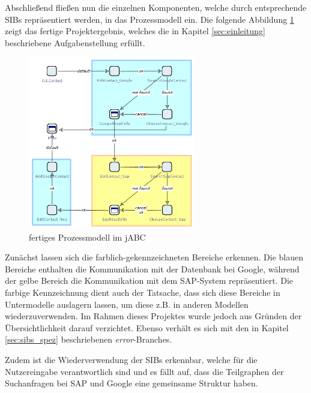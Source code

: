 Abschließend fließen nun die einzelnen Komponenten, welche durch entsprechende SIBs repräsentiert werden, in das Prozessmodell ein. Die folgende Abbildung \ref{fig:jabcmodel} zeigt das fertige Projektergebnis, welches die in Kapitel \ref{sec:einleitung} beschriebene Aufgabenstellung erfüllt.

\begin{figure}[h!t]
\begin{center}
\includegraphics[width=0.65\textwidth]{Bilder/jabc_Model.png}
\end{center}
\caption{fertiges Prozessmodell im jABC}
\label{fig:jabcmodel} 
\end{figure} 

Zunächst lassen sich die farblich-gekennzeichneten Bereiche erkennen. Die blauen Bereiche enthalten die Kommunikation mit der Datenbank bei Google, während der gelbe Bereich die Kommunikation mit dem SAP-System repräsentiert. Die farbige Kennzeichnung dient auch der Tatsache, dass sich diese Bereiche in Untermodelle auslagern lassen, um diese z.B. in anderen Modellen wiederzuverwenden. Im Rahmen dieses Projektes wurde jedoch aus Gründen der Übersichtlichkeit darauf verzichtet. Ebenso verhält es sich mit den in Kapitel \ref{sec:sibs_spez} beschriebenen \textit{error}-Branches.

Zudem ist die Wiederverwendung der SIBs erkennbar, welche für die Nutzereingabe verantwortlich sind und es fällt auf, dass die Teilgraphen der Suchanfragen bei SAP und Google eine gemeinsame Struktur haben.



